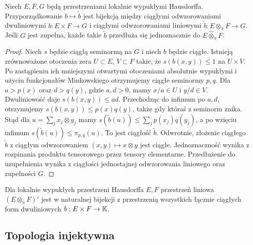 \begin{twierdzenie}
\label{thm:pi-universal24}
Niech $E,F,G$ będą przestrzeniami lokalnie wypukłymi
Hausdorffa. Przyporządkowanie $b\mapsto\widetilde b$ jest bijekcją
między ciągłymi odwzorowaniami dwuliniowymi
$b:E\times F\to G$ i ciągłymi odwzorowaniami liniowymi
$\widetilde b:E\otimes_\pi F\to G$. Jeśli $G$ jest
zupełna, każde takie $\widetilde b$ przedłuża się jednoznacznie
do $E\widehat\otimes_\pi F$.
\end{twierdzenie}
\begin{proof}
Niech $s$ będzie ciągłą seminormą na $G$ i niech $b$
będzie ciągłe. Istnieją zrównoważone otoczenia zera
$U\subset E$, $V\subset F$ takie, że $s(b(x,y))\le1$
na $U\times V$. Po zastąpieniu ich mniejszymi otwartymi
otoczeniami absolutnie wypukłymi i użyciu funkcjonałów
Minkowskiego otrzymujemy ciągłe seminormy $p,q$.
Dla $a>p(x)$ oraz $d>q(y)$, gdzie $a,d>0$,
mamy $x/a\in U$ i $y/d\in V$.
Dwuliniowość daje $s(b(x,y))\le ad$.
Przechodząc do infimum po $a,d$, otrzymujemy
$s(b(x,y))\le p(x)q(y)$, także gdy któraś
z seminorm znika. Stąd dla $u=\sum_jx_j\otimes y_j$ mamy
$s(\widetilde b(u))\le\sum_jp(x_j)q(y_j)$,
a po wzięciu infimum $s(\widetilde b(u))\le\pi_{p,q}(u)$.
To jest ciągłość $\widetilde b$. Odwrotnie, złożenie
ciągłego $\widetilde b$ z ciągłym odwzorowaniem
$(x,y)\mapsto x\otimes y$ jest ciągłe.
Jednoznaczność wynika z rozpinania produktu tensorowego
przez tensory elementarne. Przedłużenie do uzupełnienia
wynika z ciągłości jednostajnej odwzorowania liniowego
oraz zupełności $G$.
\end{proof}

\begin{wniosek}
\label{cor:pi-dual24}
Dla lokalnie wypukłych przestrzeni Hausdorffa $E,F$
przestrzeń liniowa $(E\otimes_\pi F)'$ jest w naturalnej
bijekcji z przestrzenią wszystkich łącznie ciągłych form
dwuliniowych $b:E\times F\to\mathbb K$.
\end{wniosek}

\subsection{Topologia injektywna}


